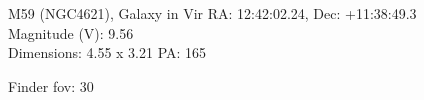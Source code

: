 \begin{block}{M59 (NGC4621), Galaxy in Vir}
    RA: 12:42:02.24, Dec: +11:38:49.3 \\ 
    Magnitude (V): 9.56 \\ 
    Dimensions: 4.55 x 3.21 PA: 165 

    Finder fov: 30 
\end{block}